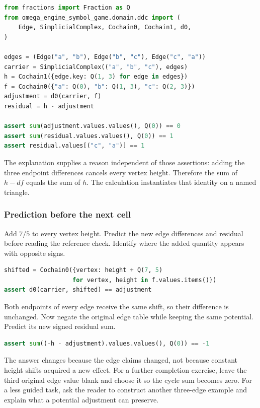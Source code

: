 \documentclass[
  11pt,
]{article}
\begin{document}
\begin{lstlisting}[language=Python]
from fractions import Fraction as Q
from omega_engine_symbol_game.domain.ddc import (
    Edge, SimplicialComplex, Cochain0, Cochain1, d0,
)

edges = (Edge("a", "b"), Edge("b", "c"), Edge("c", "a"))
carrier = SimplicialComplex(("a", "b", "c"), edges)
h = Cochain1({edge.key: Q(1, 3) for edge in edges})
f = Cochain0({"a": Q(0), "b": Q(1, 3), "c": Q(2, 3)})
adjustment = d0(carrier, f)
residual = h - adjustment

assert sum(adjustment.values.values(), Q(0)) == 0
assert sum(residual.values.values(), Q(0)) == 1
assert residual.values[("c", "a")] == 1
\end{lstlisting}

The explanation supplies a reason independent of those assertions:
adding the three endpoint differences cancels every vertex height.
Therefore the sum of \(h-df\) equals the sum of \(h\). The calculation
instantiates that identity on a named triangle.

\hypertarget{prediction-before-the-next-cell}{%
\subsubsection{Prediction before the next
cell}\label{prediction-before-the-next-cell}}

Add \(7/5\) to every vertex height. Predict the new edge differences and
residual before reading the reference check. Identify where the added
quantity appears with opposite signs.

\begin{lstlisting}[language=Python]
shifted = Cochain0({vertex: height + Q(7, 5)
                   for vertex, height in f.values.items()})
assert d0(carrier, shifted) == adjustment
\end{lstlisting}

Both endpoints of every edge receive the same shift, so their difference
is unchanged. Now negate the original edge table while keeping the same
potential. Predict its new signed residual sum.

\begin{lstlisting}[language=Python]
assert sum((-h - adjustment).values.values(), Q(0)) == -1
\end{lstlisting}

The answer changes because the edge claims changed, not because constant
height shifts acquired a new effect. For a further completion exercise,
leave the third original edge value blank and choose it so the cycle sum
becomes zero. For a less guided task, ask the reader to construct
another three-edge example and explain what a potential adjustment can
preserve.
\end{document}
